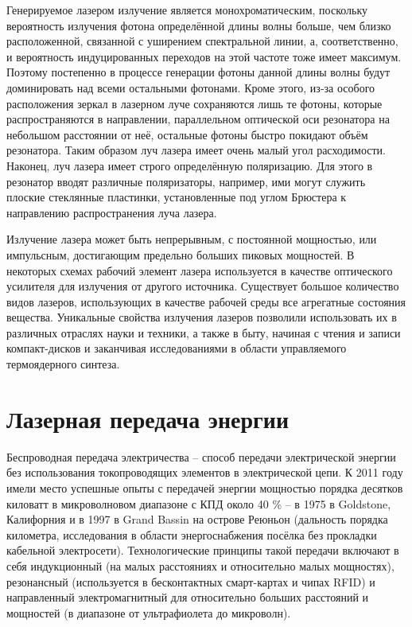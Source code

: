 \documentclass[14pt,pscyr,titlepage]{hedreport}
\begin{document}
		Генерируемое лазером излучение является монохроматическим, поскольку 
		вероятность излучения фотона определённой длины волны больше, чем 
		близко расположенной, связанной с уширением спектральной линии, а, 
		соответственно, и вероятность индуцированных переходов на этой частоте 
		тоже имеет максимум. Поэтому постепенно в процессе генерации фотоны 
		данной длины волны будут доминировать над всеми остальными фотонами. 
		Кроме этого, из-за особого расположения зеркал в лазерном луче 
		сохраняются лишь те фотоны, которые распространяются в направлении, 
		параллельном оптической оси резонатора на небольшом расстоянии от неё, 
		остальные фотоны быстро покидают объём резонатора. Таким образом луч 
		лазера имеет очень малый угол расходимости. Наконец, луч лазера 
		имеет строго определённую поляризацию. Для этого в резонатор вводят 
		различные поляризаторы, например, ими могут служить плоские 
		стеклянные пластинки, установленные под углом Брюстера к 
		направлению распространения луча лазера.

		Излучение лазера может быть непрерывным, с постоянной мощностью, или 
		импульсным, достигающим предельно больших пиковых мощностей. В некоторых 
		схемах рабочий элемент лазера используется в качестве оптического 
		усилителя для излучения от другого источника. Существует большое 
		количество видов лазеров, использующих в качестве рабочей среды все 
		агрегатные состояния вещества. Уникальные свойства излучения лазеров 
		позволили использовать их в различных отраслях науки и техники, а также 
		в быту, начиная с чтения и записи компакт-дисков и заканчивая 
		исследованиями в области управляемого термоядерного синтеза.

	\section{Лазерная передача энергии}
		Беспроводная передача электричества -- способ передачи электрической 
		энергии без использования токопроводящих элементов в электрической цепи. 
		К 2011 году имели место успешные опыты с передачей энергии мощностью 
		порядка десятков киловатт в микроволновом диапазоне с КПД около 
		40 \% -- в 1975 в Goldstone, Калифорния и в 1997 в Grand Bassin на 
		острове Реюньон (дальность порядка километра, исследования в области 
		энергоснабжения посёлка без прокладки кабельной электросети). 
		Технологические принципы такой передачи включают в себя индукционный 
		(на малых расстояниях и относительно малых мощностях), резонансный 
		(используется в бесконтактных смарт-картах и чипах RFID) и направленный 
		электромагнитный для относительно больших расстояний и мощностей 
		(в диапазоне от ультрафиолета до микроволн).
\end{document}
